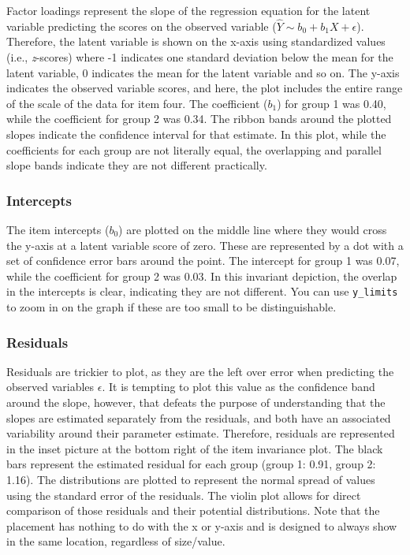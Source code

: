 \documentclass[
  man]{apa6}
\begin{document}
Factor loadings represent the slope of the regression equation for the latent variable predicting the scores on the observed variable (\(\hat{Y} \sim b_0 + b_1X + \epsilon\)). Therefore, the latent variable is shown on the x-axis using standardized values (i.e., \emph{z}-scores) where -1 indicates one standard deviation below the mean for the latent variable, 0 indicates the mean for the latent variable and so on. The y-axis indicates the observed variable scores, and here, the plot includes the entire range of the scale of the data for item four. The coefficient (\(b_1\)) for group 1 was 0.40, while the coefficient for group 2 was 0.34. The ribbon bands around the plotted slopes indicate the confidence interval for that estimate. In this plot, while the coefficients for each group are not literally equal, the overlapping and parallel slope bands indicate they are not different practically.

\hypertarget{intercepts}{%
\subsubsection{Intercepts}\label{intercepts}}

The item intercepts (\(b_0\)) are plotted on the middle line where they would cross the y-axis at a latent variable score of zero. These are represented by a dot with a set of confidence error bars around the point. The intercept for group 1 was 0.07, while the coefficient for group 2 was 0.03. In this invariant depiction, the overlap in the intercepts is clear, indicating they are not different. You can use \texttt{y\_limits} to zoom in on the graph if these are too small to be distinguishable.

\hypertarget{residuals}{%
\subsubsection{Residuals}\label{residuals}}

Residuals are trickier to plot, as they are the left over error when predicting the observed variables \(\epsilon\). It is tempting to plot this value as the confidence band around the slope, however, that defeats the purpose of understanding that the slopes are estimated separately from the residuals, and both have an associated variability around their parameter estimate. Therefore, residuals are represented in the inset picture at the bottom right of the item invariance plot. The black bars represent the estimated residual for each group (group 1: 0.91, group 2: 1.16). The distributions are plotted to represent the normal spread of values using the standard error of the residuals. The violin plot allows for direct comparison of those residuals and their potential distributions. Note that the placement has nothing to do with the x or y-axis and is designed to always show in the same location, regardless of size/value.
\end{document}
